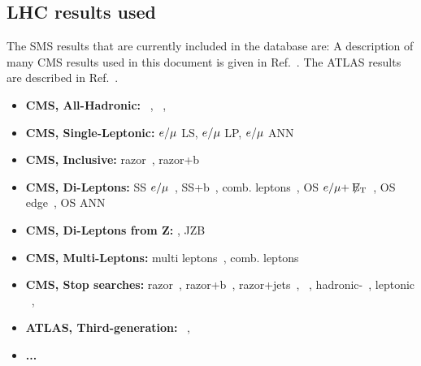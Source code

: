 \subsection{LHC results used}
\label{ssec:lhc}
The SMS results that are currently included in the database are:
A description of many CMS results used in this document is given in
Ref.~\cite{cms:2013wc}. The ATLAS results are described in
Ref.~\cite{Okawa:2011xg}. 

\begin{itemize}
\item {\bf CMS, All-Hadronic:} \AlphaT~\cite{SUS-11-022}, \HsTjets~\cite{SUS-12-011}, \MTtwo~\cite{SUS-12-002} 
\item {\bf CMS, Single-Leptonic:} $e/\mu$ LS, $e/\mu$ LP, $e/\mu$ ANN~\cite{SUS-12-010}
\item {\bf CMS, Inclusive:} razor~\cite{SUS-12-005}, razor+b~\cite{SUS-11-024}
\item {\bf CMS, Di-Leptons:} SS $e/\mu$~\cite{SUS-11-010}, SS+b~\cite{SUS-11-020}, comb. leptons~\cite{SUS-12-006}, OS $e/\mu +\not\!\!\rm{E}_{\mathrm{T}}$~\cite{SUS-11-011}, OS \emu edge~\cite{SUS-11-011}, OS \emu ANN~\cite{SUS-11-018}
\item {\bf CMS, Di-Leptons from Z:} \ZMET, JZB~\cite{SUS-11-021}
\item {\bf CMS, Multi-Leptons:} multi leptons~\cite{SUS-11-013}, comb. leptons~\cite{SUS-12-006}
\item {\bf CMS, Stop searches:} razor~\cite{SUS-12-005},
razor+b~\cite{SUS-11-024}, razor+jets~\cite{SUS-12-009},
\AlphaT~\cite{SUS-11-022}, hadronic-\sTop~\cite{SUS-11-030}, leptonic \sTop~\cite{SUS-12-023}, 
\item {\bf ATLAS, Third-generation:} \ATLLepStop~\cite{ATLAS-CONF-2012-166}, \ATLHadStop~\cite{ATLAS-CONF-2013-001}
\item {\bf ...}
\end{itemize}


